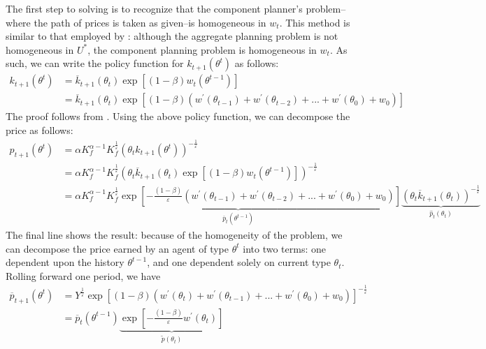 \documentclass[11pt]{article}
\begin{document}
The first step to solving is to recognize that the component planner's
problem--where the path of prices is taken as given--is homogeneous
in $w_{t}$. This method is similar to that employed by \cite{angeletos2007uninsured}: although the aggregate planning problem is not homogeneous in $U^{*}$, the component planning problem is homogeneous in $w_{t}$.
As such, we can write the policy function for $k_{t+1}\left(\theta^{t}\right)$
as follows: 
\begin{align*}
k_{t+1}\left(\theta^{t}\right) & =\overline{k}_{t+1}\left(\theta_{t}\right)\exp\left[\left(1-\beta\right)w_{t}\left(\theta^{t-1}\right)\right]\\
 & =\overline{k}_{t+1}\left(\theta_{t}\right)\exp\left[\left(1-\beta\right)\left(w^{\prime}\left(\theta_{t-1}\right)+w^{\prime}\left(\theta_{t-2}\right)+...+w^{\prime}\left(\theta_{0}\right)+w_{0}\right)\right]
\end{align*}
The proof follows from \cite{golosov2016recursive}. Using the above policy function, we can decompose the price
as follows: 
\begin{align}
p_{t+1}\left(\theta^{t}\right) & =\alpha K_{f}^{\alpha-1}K_{f}^{\frac{1}{\varepsilon}}\left(\theta_{t}k_{t+1}\left(\theta^{t}\right)\right)^{-\frac{1}{\varepsilon}}\\
 & =\alpha K_{f}^{\alpha-1}K_{f}^{\frac{1}{\varepsilon}}\left(\theta_{t}\overline{k}_{t+1}\left(\theta_{t}\right)\exp\left[\left(1-\beta\right)w_{t}\left(\theta^{t-1}\right)\right]\right)^{-\frac{1}{\varepsilon}}\\
 & =\underbrace{\alpha K_{f}^{\alpha-1}K_{f}^{\frac{1}{\varepsilon}}\exp\left[-\frac{\left(1-\beta\right)}{\varepsilon}\left(w^{\prime}\left(\theta_{t-1}\right)+w^{\prime}\left(\theta_{t-2}\right)+...+w^{\prime}\left(\theta_{0}\right)+w_{0}\right)\right]}_{\overline{p}_{t}\left(\theta^{t-1}\right)}\underbrace{\left(\theta_{t}\overline{k}_{t+1}\left(\theta_{t}\right)\right)^{-\frac{1}{\varepsilon}}}_{\hat{p}_{t}\left(\theta_{t}\right)}
\end{align}
The final line shows the result: because of the homogeneity of the
problem, we can decompose the price earned by an agent of type $\theta^{t}$
into two terms: one dependent upon the history $\theta^{t-1}$, and
one dependent solely on current type $\theta_{t}$. Rolling forward
one period, we have 
\begin{align}
\overline{p}_{t+1}\left(\theta^{t}\right) & =Y^{\frac{1}{\varepsilon}}\exp\left[\left(1-\beta\right)\left(w^{\prime}\left(\theta_{t}\right)+w^{\prime}\left(\theta_{t-1}\right)+...+w^{\prime}\left(\theta_{0}\right)+w_{0}\right)\right]^{-\frac{1}{\varepsilon}}\\
 & =\overline{p}_{t}\left(\theta^{t-1}\right)\underbrace{\exp\left[-\frac{\left(1-\beta\right)}{\varepsilon}w^{\prime}\left(\theta_{t}\right)\right]}_{\tilde{p}\left(\theta_{t}\right)}
\end{align}
\end{document}
